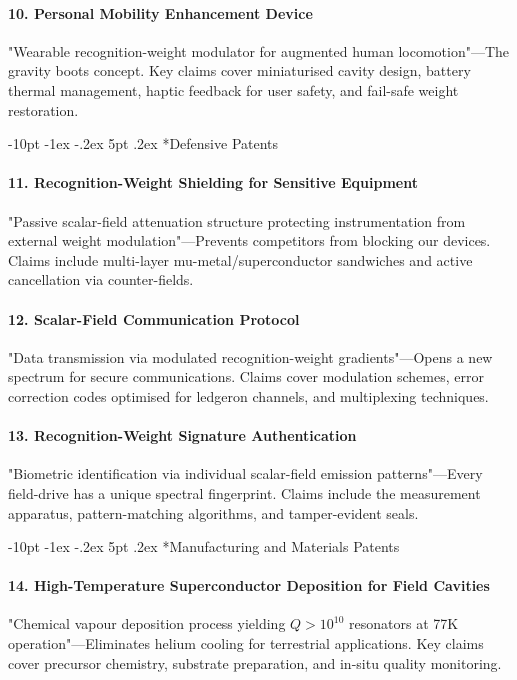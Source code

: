 \documentclass[12pt,letterpaper]{book}
\makeatletter
\renewcommand\section{\@startsection{section}{1}{\z@}%
  {-8pt \@plus -1ex \@minus -.2ex}%
  {4pt \@plus.2ex}%
  {\normalfont\large\bfseries}}
\renewcommand\section{\@startsection {section}{1}{\z@}%
                {-10pt \@plus -1ex \@minus -.2ex}%
                {5pt \@plus.2ex}%
                {\normalfont\large\bfseries}}
\makeatother
\begin{document}
\paragraph{10. Personal Mobility Enhancement Device}
"Wearable recognition-weight modulator for augmented human locomotion"—The gravity boots concept.  Key claims cover miniaturised cavity design, battery thermal management, haptic feedback for user safety, and fail-safe weight restoration.

\section*{Defensive Patents}

\paragraph{11. Recognition-Weight Shielding for Sensitive Equipment}
"Passive scalar-field attenuation structure protecting instrumentation from external weight modulation"—Prevents competitors from blocking our devices.  Claims include multi-layer mu-metal/superconductor sandwiches and active cancellation via counter-fields.

\paragraph{12. Scalar-Field Communication Protocol}
"Data transmission via modulated recognition-weight gradients"—Opens a new spectrum for secure communications.  Claims cover modulation schemes, error correction codes optimised for ledgeron channels, and multiplexing techniques.

\paragraph{13. Recognition-Weight Signature Authentication}
"Biometric identification via individual scalar-field emission patterns"—Every field-drive has a unique spectral fingerprint.  Claims include the measurement apparatus, pattern-matching algorithms, and tamper-evident seals.

\section*{Manufacturing and Materials Patents}

\paragraph{14. High-Temperature Superconductor Deposition for Field Cavities}
"Chemical vapour deposition process yielding $Q>10^{10}$ resonators at 77K operation"—Eliminates helium cooling for terrestrial applications.  Key claims cover precursor chemistry, substrate preparation, and in-situ quality monitoring.
\end{document}
